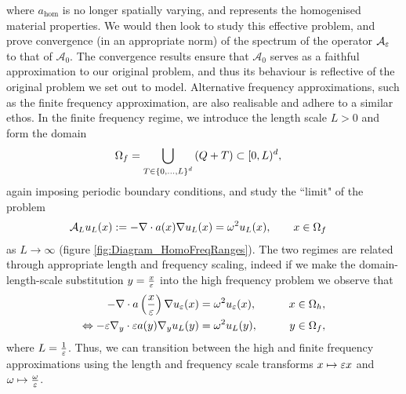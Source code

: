 where $a_{\mathrm{hom}}$ is no longer spatially varying, and represents the homogenised material properties.
We would then look to study this effective problem, and prove convergence (in an appropriate norm) of the spectrum of the operator $\mathcal{A}_{\varepsilon}$ to that of $\mathcal{A}_0$.
The convergence results ensure that $\mathcal{A}_0$ serves as a faithful approximation to our original problem, and thus its behaviour is reflective of the original problem we set out to model.
Alternative frequency approximations, such as the finite frequency approximation, are also realisable and adhere to a similar ethos.
In the finite frequency regime, we introduce the length scale $L>0$ and form the domain
\begin{align*}
	\Omega_f &= \bigcup_{T\in\left\{ 0,...,L \right\}^d}\left( Q + T \right)\subset[0,L)^d,
\end{align*}
again imposing periodic boundary conditions, and study the ``limit" of the problem
\begin{align*}
	\mathcal{A}_L u_L(x) &:= -\nabla\cdot a(x)\nabla u_L(x) = \omega^2 u_L(x), \qquad x\in\Omega_f
\end{align*}
as $L\rightarrow\infty$ (figure \ref{fig:Diagram_HomoFreqRanges}).
The two regimes are related through appropriate length and frequency scaling, indeed if we make the domain-length-scale substitution $y = \frac{x}{\varepsilon}$ into the high frequency problem we observe that
\begin{align*}
	-\nabla\cdot a\left( \frac{x}{\varepsilon} \right)\nabla u_{\varepsilon}(x) &= \omega^2 u_{\varepsilon}(x), &\qquad x\in\Omega_h, \\
	\Leftrightarrow -\varepsilon\nabla_{y}\cdot \varepsilon a(y)\nabla_{y}u_{L}(y) &= \omega^2 u_{L}(y), &\qquad y\in\Omega_f,
\end{align*}
where $L = \frac{1}{\varepsilon}$.
Thus, we can transition between the high and finite frequency approximations using the length and frequency scale transforms $x \mapsto \varepsilon x$ and $\omega \mapsto \frac{\omega}{\varepsilon}$.


